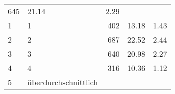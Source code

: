 \begin{longtable}{lXrrr}
       \num{645} &
       \num[round-mode=places,round-precision=2]{21.14} &
         \num[round-mode=places,round-precision=2]{2.29} \\

     1 &
     \multicolumn{1}{X}{ 1   } &


       \num{402} &
       \num[round-mode=places,round-precision=2]{13.18} &
         \num[round-mode=places,round-precision=2]{1.43} \\

     2 &
     \multicolumn{1}{X}{ 2   } &


       \num{687} &
       \num[round-mode=places,round-precision=2]{22.52} &
         \num[round-mode=places,round-precision=2]{2.44} \\

     3 &
     \multicolumn{1}{X}{ 3   } &


       \num{640} &
       \num[round-mode=places,round-precision=2]{20.98} &
         \num[round-mode=places,round-precision=2]{2.27} \\

     4 &
     \multicolumn{1}{X}{ 4   } &


       \num{316} &
       \num[round-mode=places,round-precision=2]{10.36} &
         \num[round-mode=places,round-precision=2]{1.12} \\

     5 &
     \multicolumn{1}{X}{ überdurchschnittlich   } &



\end{longtable}
